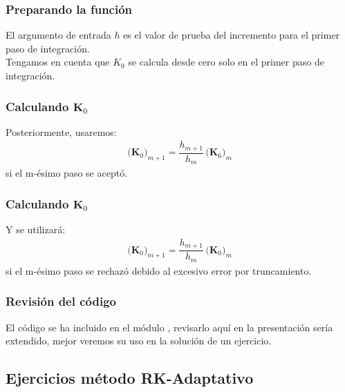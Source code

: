\documentclass[12pt]{beamer}
\begin{document}
\begin{frame}
\frametitle{Preparando la función}
El argumento de entrada $h$ es el valor de prueba del incremento para el primer paso de integración.
\\
\bigskip
\pause
Tengamos en cuenta que $K_{0}$ se calcula desde cero solo en el primer paso de integración.
\end{frame}
\begin{frame}
\frametitle{Calculando $\textbf{K}_{0}$}
Posteriormente, usaremos:
\pause
\begin{align*}
\big( \mathbf{K}_{0} \big)_{m+1} = \dfrac{h_{m+1}}{h_{m}} \, \big( \mathbf{K}_{6} \big)_{m}
\end{align*}
\pause
si el m-ésimo paso se aceptó.
\end{frame}
\begin{frame}
\frametitle{Calculando $\textbf{K}_{0}$}
Y se utilizará:
\pause
\begin{align*}
\big( \mathbf{K}_{0} \big)_{m+1} = \dfrac{h_{m+1}}{h_{m}} \, \big( \mathbf{K}_{0} \big)_{m}
\end{align*}
\pause
si el m-ésimo paso se rechazó debido al excesivo error por truncamiento.
\end{frame}
\begin{frame}
\frametitle{Revisión del código}
El código  se ha incluido en el módulo , \pause revisarlo aquí en la presentación sería extendido, mejor veremos su uso en la solución de un ejercicio.
\end{frame}

\subsection{Ejercicios método RK-Adaptativo}
\end{document}
